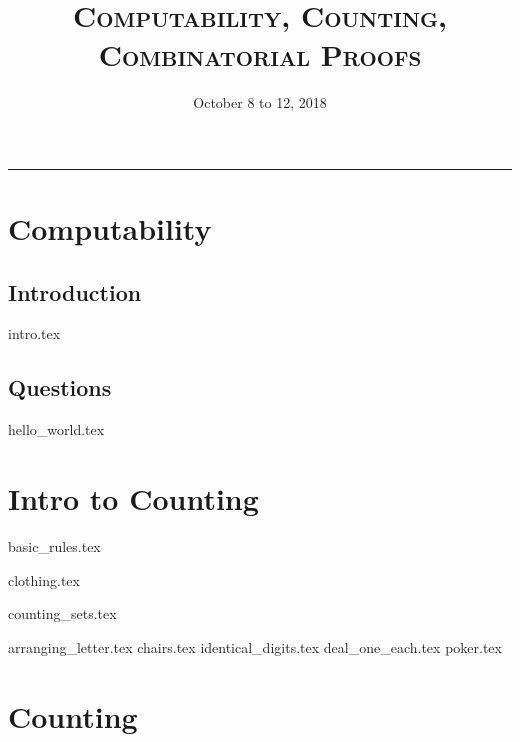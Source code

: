 \documentclass{exam}
\title{\textsc{Computability, Counting, Combinatorial Proofs}}
\date{October 8 to 12, 2018}
\begin{document}
\maketitle
\rule{\textwidth}{0.15em}
\fontsize{12}{15}\selectfont
\thispagestyle{empty}

\section{Computability}
\subsection{Introduction}
{intro.tex}
\subsection{Questions}
\begin{questions}
{hello_world.tex}
\end{questions}

\newpage

\section{Intro to Counting}
{basic_rules.tex}
\begin{questions}
{clothing.tex}
\end{questions}

{counting_sets.tex}
\begin{questions}
{arranging_letter.tex}
{chairs.tex}
{identical_digits.tex} 
{deal_one_each.tex}
{poker.tex}

\end{questions}

\section{Counting}
\end{document}

